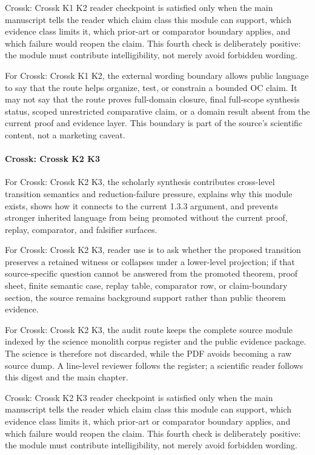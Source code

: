 Crossk: Crossk K1 K2 reader checkpoint is satisfied only when the main manuscript tells the reader which claim class this module can support, which evidence class limits it, which prior-art or comparator boundary applies, and which failure would reopen the claim. This fourth check is deliberately positive: the module must contribute intelligibility, not merely avoid forbidden wording.


For Crossk: Crossk K1 K2, the external wording boundary allows public language to say that the route helps organize, test, or constrain a bounded OC claim. It may not say that the route proves full-domain closure, final full-scope synthesis status, scoped unrestricted comparative claim, or a domain result absent from the current proof and evidence layer. This boundary is part of the source's scientific content, not a marketing caveat.


\paragraph{Crossk: Crossk K2 K3}

For Crossk: Crossk K2 K3, the scholarly synthesis contributes cross-level transition semantics and reduction-failure pressure, explains why this module exists, shows how it connects to the current 1.3.3 argument, and prevents stronger inherited language from being promoted without the current proof, replay, comparator, and falsifier surfaces.


For Crossk: Crossk K2 K3, reader use is to ask whether the proposed transition preserves a retained witness or collapses under a lower-level projection; if that source-specific question cannot be answered from the promoted theorem, proof sheet, finite semantic case, replay table, comparator row, or claim-boundary section, the source remains background support rather than public theorem evidence.


For Crossk: Crossk K2 K3, the audit route keeps the complete source module indexed by the science monolith corpus register and the public evidence package. The science is therefore not discarded, while the PDF avoids becoming a raw source dump. A line-level reviewer follows the register; a scientific reader follows this digest and the main chapter.


Crossk: Crossk K2 K3 reader checkpoint is satisfied only when the main manuscript tells the reader which claim class this module can support, which evidence class limits it, which prior-art or comparator boundary applies, and which failure would reopen the claim. This fourth check is deliberately positive: the module must contribute intelligibility, not merely avoid forbidden wording.


